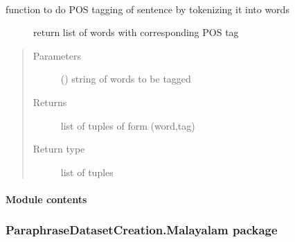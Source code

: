 \documentclass[letterpaper,10pt,english]{sphinxmanual}
\begin{document}
\begin{fulllineitems}
\begin{fulllineitems}
\end{fulllineitems}


\begin{fulllineitems}
\label{\detokenize{ParaphraseDatasetCreation.Hindi:ParaphraseDatasetCreation.Hindi.Positive.Positive_Paraphrases.get_tagged_sent}}~\begin{description}
\item[{function to do POS tagging of sentence by tokenizing it into words}] \leavevmode
return list of words with corresponding POS tag

\end{description}
\begin{quote}\begin{description}
\item[{Parameters}] \leavevmode
{} () \textendash{} string of words to be tagged

\item[{Returns}] \leavevmode
list of tuples of form (word,tag)

\item[{Return type}] \leavevmode
list of tuples

\end{description}\end{quote}

\end{fulllineitems}


\end{fulllineitems}



\paragraph{Module contents}
\label{\detokenize{ParaphraseDatasetCreation.Hindi:module-ParaphraseDatasetCreation.Hindi}}\label{\detokenize{ParaphraseDatasetCreation.Hindi:module-contents}}

\subsubsection{ParaphraseDatasetCreation.Malayalam package}
\label{\detokenize{ParaphraseDatasetCreation.Malayalam:paraphrasedatasetcreation-malayalam-package}}\label{\detokenize{ParaphraseDatasetCreation.Malayalam::doc}}
\end{document}
